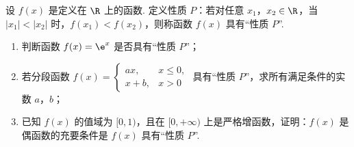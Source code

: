 \begin{problem}
设 \(f(x)\) 是定义在 \(\R\) 上的函数. 定义性质 \(P\)：若对任意 \(x_1\)，\(x_2\in\R\)，当 \(|x_1|<|x_2|\) 时，\(f(x_1)<f(x_2)\)，则称函数 \(f(x)\) 具有“性质 \(P\)”.

\begin{enumerate}
\item 判断函数 \(f(x)=\e^x\) 是否具有“性质 \(P\)”；
\item 若分段函数
\(
f(x)=
\begin{cases}
ax,&x\le0,\\
x+b,&x>0
\end{cases}
\)
具有“性质 \(P\)”，求所有满足条件的实数 \(a\)，\(b\)；
\item 已知 \(f(x)\) 的值域为 \([0,1)\)，且在 \([0,+\infty)\) 上是严格增函数，证明：\(f(x)\) 是偶函数的充要条件是 \(f(x)\) 具有“性质 \(P\)”.
\end{enumerate}
\end{problem}

